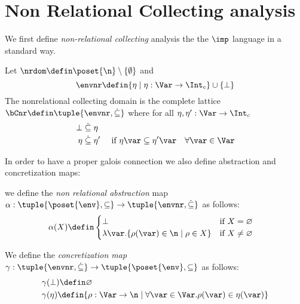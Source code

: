 \section{Non Relational Collecting analysis}
\label{sec:nonrel}

We first define \emph{non-relational collecting} analysis the the
\(\imp\) language in a standard way.

\begin{definition}
  Let \(\nrdom \defin \poset{\n} \setminus \{\emptyset\}\) and
  \begin{equation*}
    \envnr \defin \{\eta \mid \eta: \Var \to \Int_c\} \cup \{\bot\}
  \end{equation*}
  The nonrelational collecting domain is the complete lattice
  \(\bCnr \defin \tuple{\envnr,\dot{\subseteq}}\) where for all
  \(\eta,\eta':\Var \to \Int_c\)
  \begin{align*}
    \bot & \mathrel{\dot{\subseteq}} \eta\\
    \eta & \mathrel{\dot{\subseteq}} \eta' & \text{ if } \eta\var\subseteq \eta'\var \quad \forall \var\in \Var
  \end{align*}
\end{definition}

In order to have a proper galois connection we also define abstraction
and concretization maps:

\begin{definition}
  we define the \emph{non relational abstraction} map
  \(\alpha: \tuple{\poset{\env},\subseteq} \to
  \tuple{\envnr,\dot{\subseteq}}\) as follows:
  \begin{align*}
    &\alpha(X) \defin 
      \begin{cases}
        \bot & \text{if }X=\varnothing\\
        \lambda \var. \{\rho(\var) \in \n \mid \rho \in X\} &\text{if }X\neq \varnothing\\
      \end{cases}
  \end{align*}
\end{definition}

\begin{definition}
  We define the \emph{concretization map}
  \(\gamma: \tuple{\envnr,\dot{\subseteq}} \to
  \tuple{\poset{\env},\subseteq}\) as follows:
  \begin{align*}
    &\gamma(\bot) \defin \varnothing\\
    &\gamma(\eta) \defin \{\rho : \Var \to \n \mid \forall \var \in \Var. \rho(\var)\in \eta(\var)\}
  \end{align*}
\end{definition}

